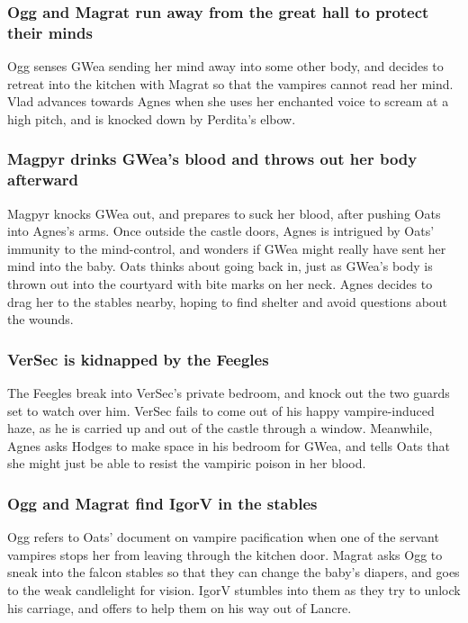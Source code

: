 \subsubsection{\Gls{Ogg} and \Gls{Magrat} run away from the great hall to protect their minds}
\Gls{Ogg} senses \Gls{GWea} sending her mind away into some other body, and decides to retreat into
the kitchen with \Gls{Magrat} so that the vampires cannot read her mind. \Gls{Vlad} advances towards
\Gls{Agnes} when she uses her enchanted voice to scream at a high pitch, and is knocked down by
\Gls{Perdita}'s elbow.

\subsubsection{\Gls{Magpyr} drinks \Gls{GWea}'s blood and throws out her body afterward}
\Gls{Magpyr} knocks \Gls{GWea} out, and prepares to suck her blood, after pushing \Gls{Oats} into
\Gls{Agnes}'s arms. Once outside the castle doors, \Gls{Agnes} is intrigued by \Gls{Oats}'
immunity to the mind-control, and wonders if \Gls{GWea} might really have sent her mind into the
baby. \Gls{Oats} thinks about going back in, just as \Gls{GWea}'s body is thrown out into the
courtyard with bite marks on her neck. \Gls{Agnes} decides to drag her to the stables nearby, hoping
to find shelter and avoid questions about the wounds.

\subsubsection{\Gls{VerSec} is kidnapped by the Feegles}
The Feegles break into \Gls{VerSec}'s private bedroom, and knock out the two guards set to watch
over him. \Gls{VerSec} fails to come out of his happy vampire-induced haze, as he is carried up
and out of the castle through a window. Meanwhile, \Gls{Agnes} asks \Gls{Hodges} to make space in
his bedroom for \Gls{GWea}, and tells \Gls{Oats} that she might just be able to resist the vampiric
poison in her blood.

\subsubsection{\Gls{Ogg} and \Gls{Magrat} find \Gls{IgorV} in the stables}
\Gls{Ogg} refers to \Gls{Oats}' document on vampire pacification when one of the servant vampires
stops her from leaving through the kitchen door. \Gls{Magrat} asks \Gls{Ogg} to sneak into the
falcon stables so that they can change the baby's diapers, and goes to the weak candlelight for
vision. \Gls{IgorV} stumbles into them as they try to unlock his carriage, and offers to help them
on his way out of Lancre.

